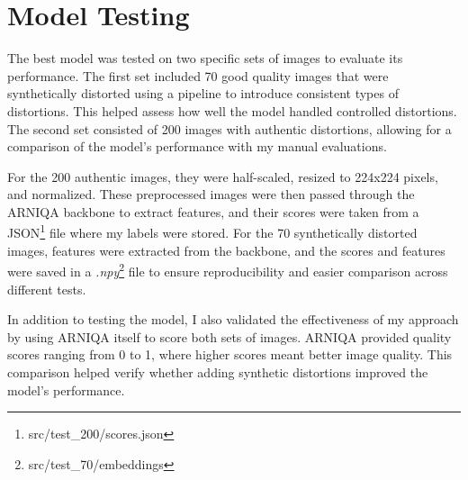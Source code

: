 \section{Model Testing}
\label{sec:ModelTesting}
The best model was tested on two specific sets of images to evaluate its performance. The first set included 70 good quality images that were synthetically distorted using a pipeline to introduce consistent types of distortions. This helped assess how well the model handled controlled distortions. The second set consisted of 200 images with authentic distortions, allowing for a comparison of the model’s performance with my manual evaluations.\par
\vspace{\baselineskip}
\noindent
For the 200 authentic images, they were half-scaled, resized to 224x224 pixels, and normalized. These preprocessed images were then passed through the ARNIQA backbone to extract features, and their scores were taken from a JSON\footnote{src/test\_200/scores.json} file where my labels were stored. For the 70 synthetically distorted images, features were extracted from the backbone, and the scores and features were saved in a \textit{.npy}\footnote{src/test\_70/embeddings} file to ensure reproducibility and easier comparison across different tests. \par
\vspace{\baselineskip}
\noindent
In addition to testing the model, I also validated the effectiveness of my approach by using ARNIQA itself to score both sets of images. ARNIQA provided quality scores ranging from 0 to 1, where higher scores meant better image quality. This comparison helped verify whether adding  synthetic distortions improved the model’s performance. \par